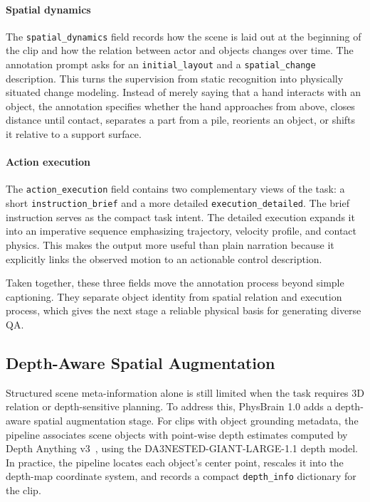 \paragraph{Spatial dynamics}
The \texttt{spatial\_dynamics} field records how the scene is laid out at the beginning of the clip and how the relation between actor and objects changes over time. The annotation prompt asks for an \texttt{initial\_layout} and a \texttt{spatial\_change} description. This turns the supervision from static recognition into physically situated change modeling. Instead of merely saying that a hand interacts with an object, the annotation specifies whether the hand approaches from above, closes distance until contact, separates a part from a pile, reorients an object, or shifts it relative to a support surface.

\paragraph{Action execution}
The \texttt{action\_execution} field contains two complementary views of the task: a short \texttt{instruction\_brief} and a more detailed \texttt{execution\_detailed}. The brief instruction serves as the compact task intent. The detailed execution expands it into an imperative sequence emphasizing trajectory, velocity profile, and contact physics. This makes the output more useful than plain narration because it explicitly links the observed motion to an actionable control description.

Taken together, these three fields move the annotation process beyond simple captioning. They separate object identity from spatial relation and execution process, which gives the next stage a reliable physical basis for generating diverse QA. 

\subsection{Depth-Aware Spatial Augmentation}

Structured scene meta-information alone is still limited when the task requires 3D relation or depth-sensitive planning. To address this, PhysBrain 1.0 adds a depth-aware spatial augmentation stage. For clips with object grounding metadata, the pipeline associates scene objects with point-wise depth estimates computed by Depth Anything v3~\cite{lin2025depth}, using the DA3NESTED-GIANT-LARGE-1.1 depth model. In practice, the pipeline locates each object's center point, rescales it into the depth-map coordinate system, and records a compact \texttt{depth\_info} dictionary for the clip.

